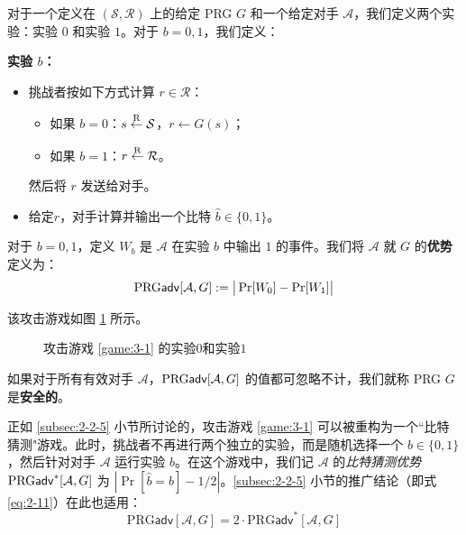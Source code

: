 \begin{game}[伪随机生成器]\label{game:3-1}
对于一个定义在 $(\mathcal{S},\mathcal{R})$ 上的给定 PRG $G$ 和一个给定对手 $\mathcal{A}$，我们定义两个实验：实验 $0$ 和实验 $1$。对于 $b=0,1$，我们定义：

\noindent\textbf{实验 $b$：}
\begin{itemize}
	\item 挑战者按如下方式计算 $r\in\mathcal{R}$：
	\begin{itemize}
		\item 如果 $b=0$：$s\overset{\rm R}\leftarrow\mathcal{S}$，$r\leftarrow G(s)$；
		\item 如果 $b=1$：$r\overset{\rm R}\leftarrow\mathcal{R}$。
	\end{itemize}
	然后将 $r$ 发送给对手。
	\item 给定$r$，对手计算并输出一个比特 $\hat{b}\in\{0,1\}$。
\end{itemize}

对于 $b=0,1$，定义 $W_b$ 是 $\mathcal{A}$ 在实验 $b$ 中输出 $1$ 的事件。我们将 $\mathcal{A}$ 就 $G$ 的\textbf{优势}定义为：
\[
{\rm PRG\mathsf{adv}}[\mathcal{A},G]
:=
\big\lvert
\Pr[W_0]-\Pr[W_1]
\big\rvert
\]
\end{game}

该攻击游戏如图 \ref{fig:3-1} 所示。

\begin{figure}
	\centering
	
	\caption{攻击游戏 \ref{game:3-1} 的实验$0$和实验$1$}
	\label{fig:3-1}
\end{figure}

\begin{definition}\label{def:3-1}
如果对于所有有效对手 $\mathcal{A}$，${\rm PRG\mathsf{adv}}[\mathcal{A},G]$ 的值都可忽略不计，我们就称 PRG $G$ 是\textbf{安全的}。

\end{definition}

正如 \ref{subsec:2-2-5} 小节所讨论的，攻击游戏 \ref{game:3-1} 可以被重构为一个``比特猜测"游戏。此时，挑战者不再进行两个独立的实验，而是随机选择一个 $b\in\{0,1\}$，然后针对对手 $\mathcal{A}$ 运行实验 $b$。在这个游戏中，我们记 $\mathcal{A}$ 的\emph{比特猜测优势} ${\rm PRG\mathsf{adv}}^*[\mathcal{A},G]$ 为 $|\Pr[\hat{b}=b]-1/2|$。\ref{subsec:2-2-5} 小节的推广结论（即式 \ref{eq:2-11}）在此也适用：
\begin{equation}
\mathrm{PRG}\mathsf{adv}[\mathcal{A},G]
=2\cdot
\mathrm{PRG}\mathsf{adv}^*[\mathcal{A},G]
\end{equation}

